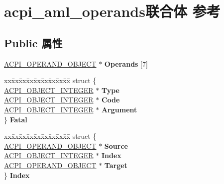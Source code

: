 \hypertarget{unionacpi__aml__operands}{}\section{acpi\+\_\+aml\+\_\+operands联合体 参考}
\label{unionacpi__aml__operands}
\subsection*{Public 属性}
\begin{DoxyCompactItemize}
\item 
\mbox{\label{unionacpi__aml__operands_a3180a709a8c2aba99398482fe6690fe7}} 
\hyperlink{unionacpi__operand__object}{A\+C\+P\+I\+\_\+\+O\+P\+E\+R\+A\+N\+D\+\_\+\+O\+B\+J\+E\+CT} $\ast$ {\bfseries Operands} \mbox{[}7\mbox{]}
\item 
\mbox{\label{unionacpi__aml__operands_a90b7cda8c25d962bb3909cd7744129bc}} 
\begin{tabbing}
xx\=xx\=xx\=xx\=xx\=xx\=xx\=xx\=xx\=\kill
struct \{\\
\>\hyperlink{structacpi__object__integer}{ACPI\_OBJECT\_INTEGER} $\ast$ {\bfseries Type}\\
\>\hyperlink{structacpi__object__integer}{ACPI\_OBJECT\_INTEGER} $\ast$ {\bfseries Code}\\
\>\hyperlink{structacpi__object__integer}{ACPI\_OBJECT\_INTEGER} $\ast$ {\bfseries Argument}\\
\} {\bfseries Fatal}\\

\end{tabbing}\item 
\mbox{\label{unionacpi__aml__operands_a0f8ddfd973762e5e961a73d20a0a6fd8}} 
\begin{tabbing}
xx\=xx\=xx\=xx\=xx\=xx\=xx\=xx\=xx\=\kill
struct \{\\
\>\hyperlink{unionacpi__operand__object}{ACPI\_OPERAND\_OBJECT} $\ast$ {\bfseries Source}\\
\>\hyperlink{structacpi__object__integer}{ACPI\_OBJECT\_INTEGER} $\ast$ {\bfseries Index}\\
\>\hyperlink{unionacpi__operand__object}{ACPI\_OPERAND\_OBJECT} $\ast$ {\bfseries Target}\\
\} {\bfseries Index}\\


\end{tabbing}
\end{DoxyCompactItemize}

